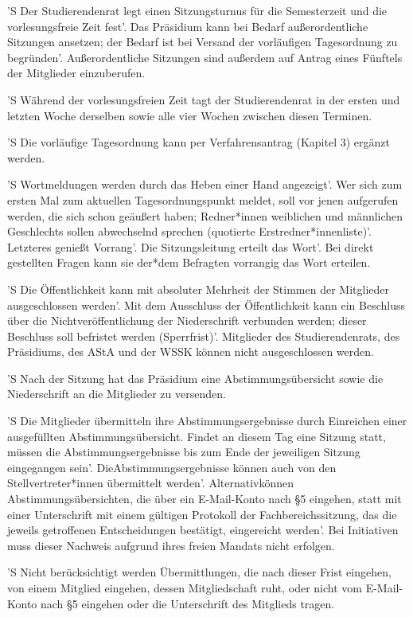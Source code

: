 \documentclass[fontsize=12pt,parskip=half, ref=short]{scrartcl}
\begin{document}
\begin{contract}
  'S Der Studierendenrat legt einen Sitzungsturnus für die Semesterzeit und die
  vorlesungsfreie Zeit fest'. Das Präsidium kann bei Bedarf außerordentliche
  Sitzungen ansetzen; der Bedarf ist bei Versand der vorläufigen Tagesordnung zu
  begründen'. Außerordentliche Sitzungen sind außerdem auf Antrag eines Fünftels
  der Mitglieder einzuberufen.

  'S Während der vorlesungsfreien Zeit tagt der Studierendenrat in der ersten
  und letzten Woche derselben sowie alle vier Wochen zwischen diesen Terminen.

  'S Die vorläufige Tagesordnung kann per Verfahrensantrag (Kapitel 3) ergänzt
  werden.

  'S Wortmeldungen werden durch das Heben einer Hand angezeigt'. Wer sich zum
  ersten Mal zum aktuellen Tagesordnungspunkt meldet, soll vor jenen aufgerufen
  werden, die sich schon geäußert haben; Redner*innen weiblichen und männlichen
  Geschlechts sollen abwechselnd sprechen (quotierte Erstredner*innenliste)'.
  Letzteres genießt Vorrang'. Die Sitzungsleitung erteilt das Wort'. Bei direkt
  gestellten Fragen kann sie der*dem Befragten vorrangig das Wort erteilen.

  'S Die Öffentlichkeit kann mit absoluter Mehrheit der Stimmen der Mitglieder
  ausgeschlossen werden'. Mit dem Ausschluss der Öffentlichkeit kann ein
  Beschluss über die Nichtveröffentlichung der Niederschrift verbunden werden;
  dieser Beschluss soll befristet werden (Sperrfrist)'. Mitglieder des
  Studierendenrats, des Präsidiums, des AStA und der WSSK können nicht
  ausgeschlossen werden.

  'S Nach der Sitzung hat das Präsidium eine Abstimmungsübersicht sowie die
  Niederschrift an die Mitglieder zu versenden.

  'S Die Mitglieder übermitteln ihre Abstimmungsergebnisse durch Einreichen
  einer ausgefüllten Abstimmungsübersicht. Findet an diesem Tag eine Sitzung
  statt, müssen die Abstimmungsergebnisse bis zum Ende der jeweiligen Sitzung
  eingegangen sein'. DieAbstimmungsergebnisse können auch von den
  Stellvertreter*innen übermittelt werden'. Alternativkönnen
  Abstimmungsübersichten, die über ein E-Mail-Konto nach §5 eingehen, statt mit
  einer Unterschrift mit einem gültigen Protokoll der Fachbereichssitzung, das
  die jeweils getroffenen Entscheidungen bestätigt, eingereicht werden'. Bei
  Initiativen muss dieser Nachweis aufgrund ihres freien Mandats nicht erfolgen.

  'S Nicht berücksichtigt werden Übermittlungen, die nach dieser Frist eingehen,
  von einem Mitglied eingehen, dessen Mitgliedschaft ruht, oder nicht vom
  E-Mail-Konto nach §5 eingehen oder die Unterschrift des Mitglieds tragen.


\end{contract}
\end{document}
